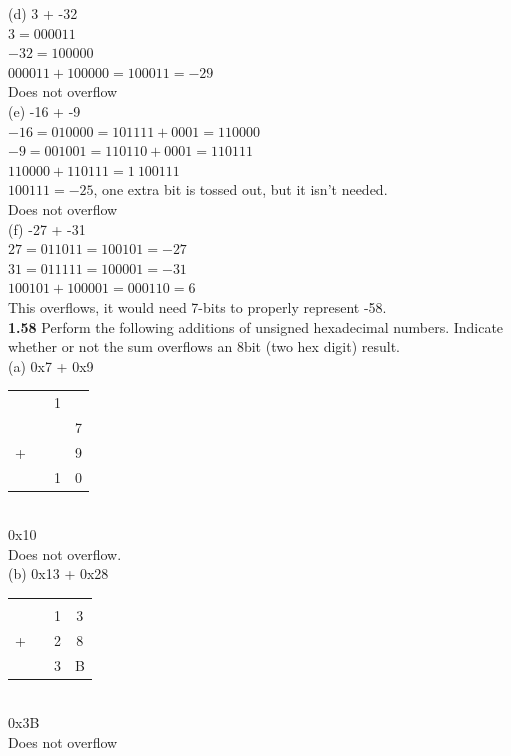 \documentclass[12pt,a4paper]{report}
\begin{document}
\begin{normalsize}
(d) 3 + -32 \\
$ 3 = 000011 $ \\
$ -32 = 100000 $ \\
$ 000011 + 100000 = 100011 = -29 $ \\
Does not overflow \\

(e) -16 + -9 \\
$ -16 = 010000 = 101111 + 0001 = 110000 $ \\
$ -9 = 001001 = 110110 + 0001 = 110111 $ \\
$ 110000 + 110111 = 1\: 100111 $ \\
$ 100111 = -25 $, one extra bit is tossed out, but it isn't needed. \\
Does not overflow \\

(f) -27 + -31 \\
$ 27 = 011011 = 100101 = -27 $ \\
$ 31 = 011111 = 100001 = -31 $ \\ 
$ 100101 + 100001 = 000110 = 6 $ \\
This overflows, it would need 7-bits to properly represent -58. \\

\textbf{1.58} Perform the following additions of unsigned hexadecimal numbers. Indicate whether or not the sum overflows an 8bit (two hex digit) result. \\
(a) 0x7 + 0x9 \\
\begin{tabular}{c@{\,}c@{\,}c@{\,}c}
  & & 1 &     \\
  & &   & 7 \\
+ & &   & 9 \\
\hline
  & & 1 & 0 \\
\end{tabular} \\
0x10 \\
Does not overflow. \\

(b) 0x13 + 0x28 \\
\begin{tabular}{c@{\,}c@{\,}c@{\,}c}
  & &   &     \\
  & & 1 & 3 \\
+ & & 2 & 8 \\
\hline
  & & 3 & B \\
\end{tabular} \\
0x3B \\
Does not overflow \\


\end{normalsize}
\end{document}
